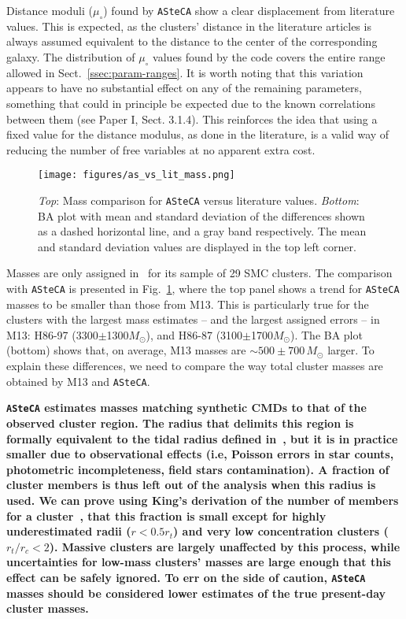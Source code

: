 \documentclass{aa}
\begin{document}
Distance moduli ($\mu_{\circ}$) found by \texttt{ASteCA} show a clear
displacement from literature values. This is expected, as the clusters' distance
in the literature articles is always assumed equivalent to the
distance to the center of the corresponding galaxy.
The distribution of $\mu_{\circ}$ values found by the code covers the entire
range allowed in Sect.~\ref{ssec:param-ranges}.
%
It is worth noting that this variation appears to have no substantial effect on
any of the remaining parameters, something that could in principle be expected
due to the known correlations between them (see Paper I, Sect. 3.1.4).
This reinforces the idea that using a fixed value for the distance modulus, as
done in the literature, is a valid way of reducing the number of free variables
at no apparent extra cost.\\

\begin{figure}
\centering
\texttt{[image: figures/as\_vs\_lit\_mass.png]}
\caption{\emph{Top}: Mass comparison for \texttt{ASteCA} versus literature
values.
\emph{Bottom}: BA plot with mean and standard deviation of the differences
shown as a dashed horizontal line, and a gray band respectively. The mean and
standard deviation values are displayed in the top left corner.}
\label{fig:as_vs_lit_mass}
\end{figure}

Masses are only assigned in~\citet[][M13]{Maia_2013} for its sample of 29
SMC clusters. The comparison with \texttt{ASteCA} is presented in
Fig.~\ref{fig:as_vs_lit_mass}, where the top panel shows a trend for
\texttt{ASteCA} masses to be smaller than those from M13. This is particularly
true for the clusters with the largest mass estimates -- and the largest
assigned errors -- in M13: H86-97 (3300$\pm$1300$M_{\odot}$), and H86-87
(3100$\pm$1700$M_{\odot}$). The BA plot (bottom) shows that, on average, M13
masses are ${\sim}500{\pm}700\,M_{\odot}$ larger.
%
To explain these differences, we need to compare the way total cluster masses
are obtained by M13 and \texttt{ASteCA}.

\textbf{\texttt{ASteCA} estimates masses matching synthetic CMDs to that of
the observed cluster region.
The radius that delimits this region is formally equivalent to the
tidal radius defined in~\cite[][see Sect.~\ref{ssec:centre-radius}]{King_1962},
but it is in practice smaller due to observational effects (i.e, Poisson
errors in star counts, photometric incompleteness, field stars contamination).
%
A fraction of cluster members is thus left out of the analysis when this radius
is used. We can prove using King's derivation of the number of
members for a cluster~\citep[Eq. 18,][]{King_1962}, that this fraction is small
except for highly underestimated radii ($r{<}0.5r_t$) and very low concentration
clusters ($r_t/r_c{<}2$).
%
Massive clusters are largely unaffected by this process, while uncertainties for
low-mass clusters' masses are large enough that this effect can be safely
ignored.
%
To err on the side of caution, \texttt{ASteCA} masses should be considered lower
estimates of the true present-day cluster masses.}
\end{document}
